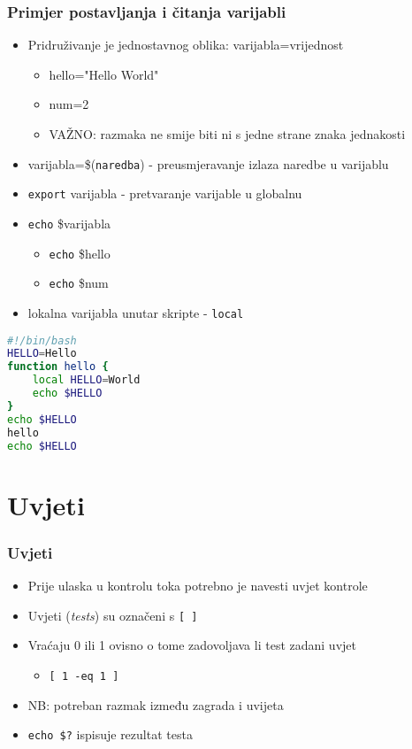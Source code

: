 \documentclass{beamer}
\newcommand{\shell}[1]{\texttt{#1}}
\begin{document}
\begin{frame}[t]
\frametitle{Primjer postavljanja i čitanja varijabli}
\begin{itemize}
	\item Pridruživanje je jednostavnog oblika: varijabla=vrijednost
		 \begin{itemize}
		 	\item hello="Hello World"
		 	\item num=2
		 	\item VAŽNO: razmaka ne smije biti ni s jedne strane znaka jednakosti
		 \end{itemize}
	 \item varijabla=\$(\shell{naredba}) - preusmjeravanje izlaza naredbe u varijablu
	 \item \shell{export} varijabla - pretvaranje varijable u globalnu
	 \item \shell{echo} \$varijabla
	 	\begin{itemize}
	 		\item \shell{echo}  \$hello
	 		\item \shell{echo}  \$num
	 	\end{itemize}
 	\item lokalna varijabla unutar skripte - \shell{local}
 	
\end{itemize}

\end{frame}
\begin{lstlisting}[language=bash]
#!/bin/bash
HELLO=Hello 
function hello {
	local HELLO=World
	echo $HELLO
}
echo $HELLO
hello
echo $HELLO
\end{lstlisting}
\section{Uvjeti}
\begin{frame}
\frametitle{Uvjeti}
\begin{itemize}
	\item Prije ulaska u kontrolu toka potrebno je navesti uvjet kontrole
	\item Uvjeti (\textit{tests}) su označeni s \shell{[ ]}
	\item Vraćaju 0 ili 1 ovisno o tome zadovoljava li test zadani uvjet
	\begin{itemize}
		\item \shell{[ 1 -eq 1 ]}
	\end{itemize}
	\item NB: potreban razmak između zagrada i uvijeta
	\item \shell{echo \$?} ispisuje rezultat testa
\end{itemize}
\end{frame}
\end{document}
